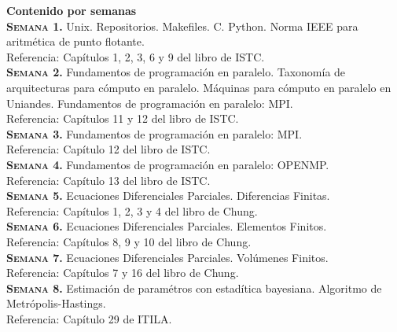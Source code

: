 \documentclass[letterpaper,10pt,onecolumn]{article}
\begin{document}
\noindent\textbf{\large {} \quad Contenido por
  semanas}\\[-0.2cm] 



\noindent\normalsize\textbf{\textsc{Semana 1.}}
Unix. Repositorios. Makefiles. C. Python. Norma IEEE para aritm\'etica de punto
flotante. \\
Referencia: Cap\'itulos 1, 2, 3, 6 y 9 del libro de ISTC.
\\[-0.3cm]

\noindent\textbf{\textsc{Semana 2.}} 
Fundamentos de programaci\'on en paralelo. Taxonom\'ia de arquitecturas
para c\'omputo en paralelo. M\'aquinas para c\'omputo en paralelo en
Uniandes.  Fundamentos de programaci\'on en paralelo: MPI.\\
Referencia: Cap\'itulos 11 y 12 del libro de ISTC.
\\[-0.3cm]  

\noindent\textbf{\textsc{Semana 3.}} 
Fundamentos de programaci\'on en paralelo: MPI.\\
Referencia: Cap\'itulo 12 del libro de ISTC.
\\[-0.3cm]  

\noindent\textbf{\textsc{Semana 4.}} 
Fundamentos de programaci\'on en paralelo: OPENMP.\\
Referencia: Cap\'itulo 13 del libro de ISTC.
\\[-0.3cm]  

\noindent\textbf{\textsc{Semana 5.}}
Ecuaciones Diferenciales Parciales. Diferencias Finitas.\\
Referencia: Cap\'itulos 1, 2, 3 y 4 del libro de Chung.
\\[-0.3cm]

\noindent\textbf{\textsc{Semana 6.}} 
Ecuaciones Diferenciales Parciales. Elementos Finitos.\\
Referencia: Cap\'itulos 8, 9 y 10 del libro de Chung.
\\[-0.3cm]  

\noindent\textbf{\textsc{Semana 7.}} 
Ecuaciones Diferenciales Parciales. Vol\'umenes Finitos.\\
Referencia: Cap\'itulos 7 y 16 del libro de Chung.
\\[-0.3cm] 

\noindent\textbf{\textsc{Semana 8.}} 
Estimaci\'on de param\'etros con estad\'itica bayesiana. 
Algoritmo de Metr\'opolis-Hastings.\\
Referencia: Cap\'itulo 29 de ITILA.
\\[-0.3cm]   
\end{document}
